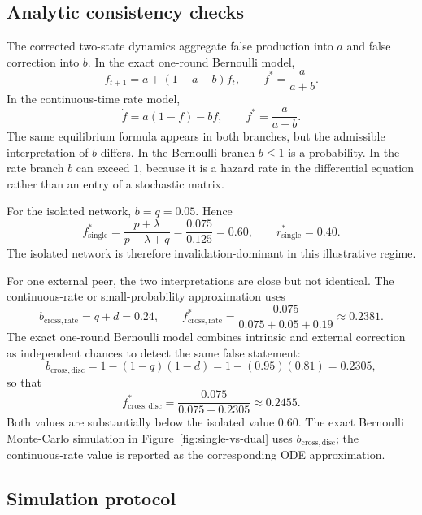 \documentclass[12pt]{article}
\theoremstyle{definition}
\begin{document}
\subsection{Analytic consistency checks}
\label{sec:analytic-consistency-checks}

The corrected two-state dynamics aggregate false production into \(a\) and
false correction into \(b\).  In the exact one-round Bernoulli model,
\[
    f_{t+1}=a+(1-a-b)f_t,
    \qquad
    f^*=\frac{a}{a+b}.
\]
In the continuous-time rate model,
\[
    \dot f=a(1-f)-bf,
    \qquad
    f^*=\frac{a}{a+b}.
\]
The same equilibrium formula appears in both branches, but the admissible
interpretation of \(b\) differs.  In the Bernoulli branch \(b\le 1\) is a
probability.  In the rate branch \(b\) can exceed \(1\), because it is a hazard
rate in the differential equation rather than an entry of a stochastic matrix.

For the isolated network, \(b=q=0.05\).  Hence
\[
    f_{\mathrm{single}}^*
    =
    \frac{p+\lambda}{p+\lambda+q}
    =
    \frac{0.075}{0.125}
    =
    0.60,
    \qquad
    r_{\mathrm{single}}^*=0.40.
\]
The isolated network is therefore invalidation-dominant in this illustrative
regime.

For one external peer, the two interpretations are close but not identical.
The continuous-rate or small-probability approximation uses
\[
    b_{\mathrm{cross,rate}}=q+d=0.24,
    \qquad
    f_{\mathrm{cross,rate}}^*
    =
    \frac{0.075}{0.075+0.05+0.19}
    \approx 0.2381.
\]
The exact one-round Bernoulli model combines intrinsic and external correction
as independent chances to detect the same false statement:
\[
    b_{\mathrm{cross,disc}}
    =
    1-(1-q)(1-d)
    =
    1-(0.95)(0.81)
    =
    0.2305,
\]
so that
\[
    f_{\mathrm{cross,disc}}^*
    =
    \frac{0.075}{0.075+0.2305}
    \approx 0.2455.
\]
Both values are substantially below the isolated value \(0.60\).  The exact
Bernoulli Monte-Carlo simulation in Figure~\ref{fig:single-vs-dual} uses
\(b_{\mathrm{cross,disc}}\); the continuous-rate value is reported as the
corresponding ODE approximation.

\subsection{Simulation protocol}
\label{sec:simulation-protocol}
\end{document}
